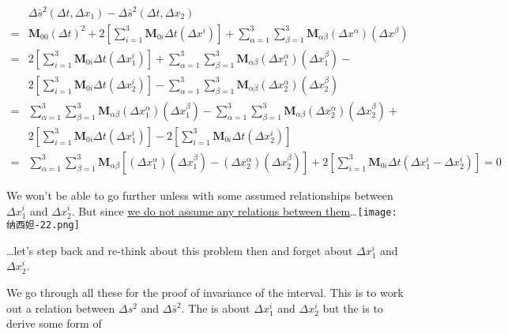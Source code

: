 \begin{tcolorbox}
    \begin{align}
        &\Delta\bar{s}^2(\Delta t, \Delta x_1) - \Delta\bar{s}^2(\Delta t, \Delta x_2) \\
        ={}& \boldsymbol{M}_{00}\left( \Delta t \right)^2 + 2\left[ \sum_{i = 1}^3\boldsymbol{M}_{0i}\Delta t \left(\Delta x^i\right) \right] + \sum_{\alpha = 1}^3\sum_{\beta = 1}^3 \boldsymbol{M}_{\alpha\beta}\left(\Delta x^{\alpha}\right)\left(\Delta x^{\beta}\right) \\
        ={}& 2\left[ \sum_{i = 1}^3\boldsymbol{M}_{0i}\Delta t \left(\Delta x_1^i\right) \right] + \sum_{\alpha = 1}^3\sum_{\beta = 1}^3 \boldsymbol{M}_{\alpha\beta}\left(\Delta x_1^{\alpha}\right)\left(\Delta x_1^{\beta}\right) - \nonumber\\
        & 2\left[ \sum_{i = 1}^3\boldsymbol{M}_{0i}\Delta t \left(\Delta x_2^i\right) \right] - \sum_{\alpha = 1}^3\sum_{\beta = 1}^3 \boldsymbol{M}_{\alpha\beta}\left(\Delta x_2^{\alpha}\right)\left(\Delta x_2^{\beta}\right) \\
        ={}& \sum_{\alpha = 1}^3\sum_{\beta = 1}^3 \boldsymbol{M}_{\alpha\beta}\left(\Delta x_1^{\alpha}\right)\left(\Delta x_1^{\beta}\right) - \sum_{\alpha = 1}^3\sum_{\beta = 1}^3 \boldsymbol{M}_{\alpha\beta}\left(\Delta x_2^{\alpha}\right)\left(\Delta x_2^{\beta}\right) + \nonumber\\
        & 2\left[ \sum_{i = 1}^3\boldsymbol{M}_{0i}\Delta t \left(\Delta x_1^i\right) \right] - 2\left[ \sum_{i = 1}^3\boldsymbol{M}_{0i}\Delta t \left(\Delta x_2^i\right) \right] \\
        ={}& \sum_{\alpha = 1}^3\sum_{\beta = 1}^3 \boldsymbol{M}_{\alpha\beta} \left[ \left(\Delta x_1^{\alpha}\right)\left(\Delta x_1^{\beta}\right) - \left(\Delta x_2^{\alpha}\right)\left(\Delta x_2^{\beta}\right) \right] + 2\left[ \sum_{i = 1}^3\boldsymbol{M}_{0i}\Delta t \left(\Delta x_1^i - \Delta x_2^i\right) \right] = 0 \label{eq:details}
    \end{align}

    We won't be able to go further unless with some assumed relationships between $\Delta x_1^i$ and $\Delta x_2^i$.
    But since \hyperlink{wrong-postulate}{we do not assume any relations between them}\ldots \texttt{[image: 纳西妲-22.png]}

    \ldots let's step back and re-think about this problem then and forget about $\Delta x_1^i$ and $\Delta x_2^i$.

    We go through all these for the proof of invariance of the interval. This is to work out a relation between $\Delta s^2$ and $\Delta \bar{s}^2$. The  is about $\Delta x_1^i$ and $\Delta x_2^i$ but the  is to derive some form of


\end{tcolorbox}
